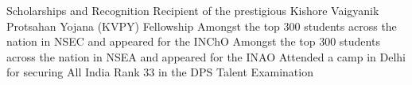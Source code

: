 
\begin{rubric}{Scholarships and Recognition}
	\entry*[2017] Recipient of the prestigious Kishore Vaigyanik Protsahan Yojana (KVPY) Fellowship
	\entry*[2019] Amongst the top 300 students across the nation in NSEC and appeared for the INChO
	\entry*[2019\phantom{}] Amongst the top 300 students across the nation in NSEA and appeared for the INAO
	\entry*[2015] Attended a camp in Delhi for securing All India Rank 33 in the DPS Talent Examination
\end{rubric}